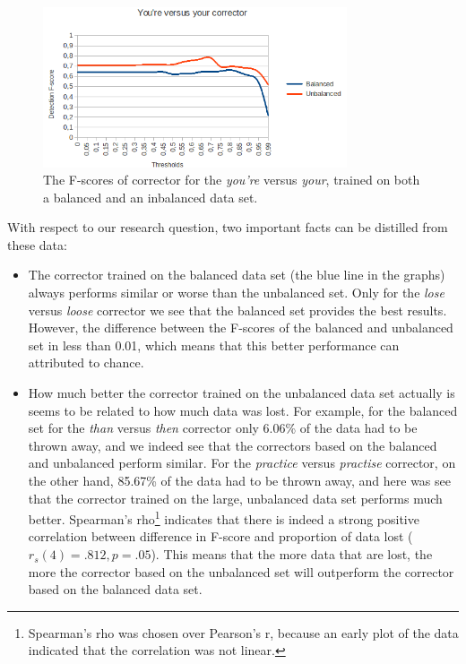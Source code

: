 \documentclass[12pt]{article}
\begin{document}
\begin{figure}[H]
\centering
\includegraphics[width=0.8\textwidth]{fscore_you'reyour.png}
\caption{The F-scores of corrector for the \emph{you're} versus \emph{your}, trained on both a balanced and an inbalanced data set.}
\end{figure}

With respect to our research question, two important facts can be distilled from these data:

\begin{itemize}

\item The corrector trained on the balanced data set (the blue line in the graphs) always performs similar or worse than the unbalanced set. Only for the \emph{lose} versus \emph{loose} corrector we see that the balanced set provides the best results. However, the difference between the F-scores of the balanced and unbalanced set in less than 0.01, which means that this better performance can attributed to chance.
\item How much better the corrector trained on the unbalanced data set actually is seems to be related to how much data was lost. For example, for the balanced set for the \emph{than} versus \emph{then} corrector only 6.06\% of the data had to be thrown away, and we indeed see that the correctors based on the balanced and unbalanced perform similar. For the \emph{practice} versus \emph{practise} corrector, on the other hand, 85.67\% of the data had to be thrown away, and here was see that the corrector trained on the large, unbalanced data set performs much better. Spearman's rho\footnote{Spearman's rho was chosen over Pearson's r, because an early plot of the data indicated that the correlation was not linear.} indicates that there is indeed a strong positive correlation between difference in F-score and proportion of data lost ($r_s(4)=.812, p=.05$). This means that the more data that are lost, the more the corrector based on the unbalanced set will outperform the corrector based on the balanced data set.

\end{itemize}
\end{document}
